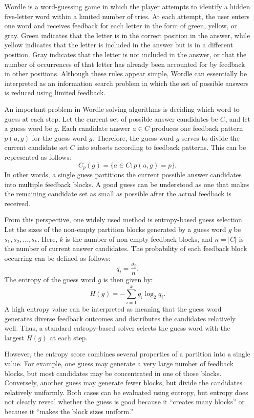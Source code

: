 \documentclass[11pt]{article}
\begin{document}
Wordle is a word-guessing game in which the player attempts to identify a hidden five-letter word within a limited number of tries.
At each attempt, the user enters one word and receives feedback for each letter in the form of green, yellow, or gray.
Green indicates that the letter is in the correct position in the answer, while yellow indicates that the letter is included in the answer but is in a different position.
Gray indicates that the letter is not included in the answer, or that the number of occurrences of that letter has already been accounted for by feedback in other positions.
Although these rules appear simple, Wordle can essentially be interpreted as an information search problem in which the set of possible answers is reduced using limited feedback.

An important problem in Wordle solving algorithms is deciding which word to guess at each step.
Let the current set of possible answer candidates be $C$, and let a guess word be $g$.
Each candidate answer $a \in C$ produces one feedback pattern $p(a,g)$ for the guess word $g$.
Therefore, the guess word $g$ serves to divide the current candidate set $C$ into subsets according to feedback patterns.
This can be represented as follows:
\[
C_p(g) = \{ a \in C : p(a,g) = p \}.
\]
In other words, a single guess partitions the current possible answer candidates into multiple feedback blocks.
A good guess can be understood as one that makes the remaining candidate set as small as possible after the actual feedback is received.

From this perspective, one widely used method is entropy-based guess selection.
Let the sizes of the non-empty partition blocks generated by a guess word $g$ be $s_1, s_2, \ldots, s_k$.
Here, $k$ is the number of non-empty feedback blocks, and $n = |C|$ is the number of current answer candidates.
The probability of each feedback block occurring can be defined as follows:
\[
q_i = \frac{s_i}{n}.
\]
The entropy of the guess word $g$ is then given by:
\[
H(g) = - \sum_{i=1}^{k} q_i \log_2 q_i.
\]
A high entropy value can be interpreted as meaning that the guess word generates diverse feedback outcomes and distributes the candidates relatively well.
Thus, a standard entropy-based solver selects the guess word with the largest $H(g)$ at each step.

However, the entropy score combines several properties of a partition into a single value.
For example, one guess may generate a very large number of feedback blocks, but most candidates may be concentrated in one of those blocks.
Conversely, another guess may generate fewer blocks, but divide the candidates relatively uniformly.
Both cases can be evaluated using entropy, but entropy does not clearly reveal whether the guess is good because it ``creates many blocks'' or because it ``makes the block sizes uniform.''
\end{document}
